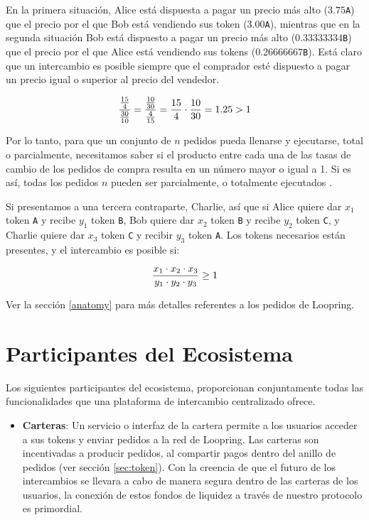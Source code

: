 \documentclass[UTF8,nofonts]{article}
\begin{document}
\begin{multicols}{2}
En la primera situaci\'on, Alice est\'a dispuesta a pagar un precio m\'as alto ($3.75$\verb|A|) que el precio por el que Bob est\'a vendiendo sus token ($3.00$\verb|A|), mientras que en la segunda situaci\'on Bob est\'a dispuesto a pagar un precio m\'as alto ($ 0.33333334 $\verb|B|) que el precio por el que Alice est\'a vendiendo sus tokens ($ 0.26666667 $\verb|B|). Est\'a claro que un intercambio es posible siempre que el comprador est\'e dispuesto a pagar un precio igual o superior al precio del vendedor.

\begin{equation}
{{15\over 4} \over {30\over 10}} = {{10\over 30} \over {4\over 15}}={15 \over 4} \cdot {10 \over 30} = 1.25 > 1
\end{equation}


Por lo tanto, para que un conjunto de $n$ pedidos pueda llenarse y ejecutarse, total o parcialmente, necesitamos saber si el producto entre cada una de las tasas de cambio de los pedidos de compra resulta en un n\'umero mayor o igual a 1. Si es as\'i, todas los pedidos $n$ pueden ser parcialmente, o totalmente ejecutados \cite {supersymmetry}.


Si presentamos a una tercera contraparte, Charlie, as\'i que si Alice quiere dar $x_1$ token \verb|A| y recibe $y_1$ token \verb|B|, Bob quiere dar $x_2$ token \verb|B| y recibe $y_2$ token \verb|C|, y Charlie quiere dar $x_3$ token \verb|C| y recibir $y_3$ token \verb|A|. Los tokens necesarios est\'an presentes, y el intercambio es posible si:

\begin{equation}
{{x_1 \cdot x_2 \cdot x_3 \over y_1 \cdot y_2 \cdot y_3} \geq 1}
\end{equation}

Ver la secci\'on \ref{anatomy} para m\'as detalles referentes a los pedidos de Loopring.

\section{Participantes del Ecosistema\label{sec:ecosystem}}
Los siguientes participantes del ecosistema, proporcionan conjuntamente todas las funcionalidades que una plataforma de intercambio centralizado ofrece.
\begin{itemize}


\item \textbf{Carteras}: Un servicio o interfaz de la cartera permite a los usuarios acceder a sus tokens y enviar pedidos a la red de Loopring. Las carteras son incentivadas a producir pedidos, al compartir pagos dentro del anillo de pedidos (ver secci\'on \ref{sec:token}). Con la creencia de que el futuro de los intercambios se llevara a cabo de manera segura dentro de las carteras de los usuarios, la conexi\'on de estos fondos de liquidez a trav\'es de nuestro protocolo es primordial.


\end{itemize}
\end{multicols}
\end{document}
